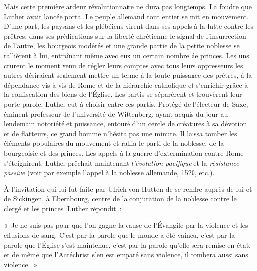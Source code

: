 \documentclass[french,twoside]{book} %
\newenvironment{quoteblock}%
  {\begin{quoting}}
  {\end{quoting}}
\newenvironment{quotebar}{%
    \def\FrameCommand{{\color{rubric!10!}\vrule width 0.5em} \hspace{0.9em}}%
    \def\OuterFrameSep{\itemsep} %
    \MakeFramed {\advance\hsize-\width \FrameRestore}
  }%
  {%
    \endMakeFramed
  }
\renewenvironment{quoteblock}%
  {%
    \savenotes
    \setstretch{0.9}
    \begin{quotebar}
  }
  {%
    \end{quotebar}
    \spewnotes
  }
\begin{document}
\noindent Mais cette première ardeur révolutionnaire ne dura pas longtemps. La foudre que Luther avait lancée porta. Le peuple allemand tout entier se mit en mouvement. D’une part, les paysans et les plébéiens virent dans ses appels à la lutte contre les prêtres, dans ses prédications sur la liberté chrétienne le signal de l’insurrection de l’autre, les bourgeois modérés et une grande partie de la petite noblesse se rallièrent à lui, entraînant même avec eux un certain nombre de princes. Les uns crurent le moment venu de régler leurs comptes avec tous leurs oppresseurs les autres désiraient seulement mettre un terme à la toute-puissance des prêtres, à la dépendance vis-à-vis de Rome et de la hiérarchie catholique et s’enrichir grâce à la confiscation des biens de l’Église. Les partis se séparèrent et trouvèrent leur porte-parole. Luther eut à choisir entre ces partis. Protégé de l’électeur de Saxe, éminent professeur de l’université de Wittenberg, ayant acquis du jour au lendemain notoriété et puissance, entouré d’un cercle de créatures à sa dévotion et de flatteurs, ce grand homme n’hésita pas une minute. Il laissa tomber les éléments populaires du mouvement et rallia le parti de la noblesse, de la bourgeoisie et des princes. Les appels à la guerre d’extermination contre Rome s’éteignirent. Luther prêchait maintenant \emph{l’évolution pacifique} et la \emph{résistance passive} (voir par exemple l’appel à la noblesse allemande, 1520, etc.).\par
À l’invitation qui lui fut faite par Ulrich von Hutten de se rendre auprès de lui et de Sickingen, à Ebernbourg, centre de la conjuration de la noblesse contre le clergé et les princes, Luther répondit :\par

\begin{quoteblock}
 \noindent « Je ne suis pas pour que l’on gagne la cause de l’Évangile par la violence et les effusions de sang. C’est par la parole que le monde a été vaincu, c’est par la parole que l’Église s’est maintenue, c’est par la parole qu’elle sera remise en état, et de même que l’Antéchrist s’en est emparé sans violence, il tombera aussi sans violence. »
\end{quoteblock}
\end{document}
